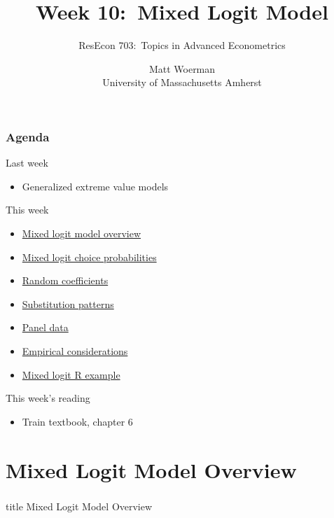 \documentclass{beamer}\usepackage[]{graphicx}\usepackage[]{color}
\title[Week 10:\ Mixed Logit Model]{Week 10:\ Mixed Logit Model}
\author[ResEcon 703:\ Advanced Econometrics]{ResEcon 703:\ Topics in Advanced Econometrics}
\date{Matt Woerman\\University of Massachusetts Amherst}
\begin{document}
{ 
\begin{frame}[noframenumbering]
    \titlepage
\end{frame}
}

\begin{frame}\frametitle{Agenda}
    Last week
    \begin{itemize}
        \item Generalized extreme value models
    \end{itemize}
    \vspace{2ex}
    This week
    \begin{itemize}
    	\item \hyperlink{page.\getpagerefnumber{overview}}{Mixed logit model overview}
    	\item \hyperlink{page.\getpagerefnumber{prob}}{Mixed logit choice probabilities}
        \item \hyperlink{page.\getpagerefnumber{random}}{Random coefficients}
        \item \hyperlink{page.\getpagerefnumber{subs}}{Substitution patterns}
        \item \hyperlink{page.\getpagerefnumber{panel}}{Panel data}
        \item \hyperlink{page.\getpagerefnumber{empirical}}{Empirical considerations}
        \item \hyperlink{page.\getpagerefnumber{example}}{Mixed logit R example}
    \end{itemize}
    \vspace{2ex}
    This week's reading
    \begin{itemize}
    	\item Train textbook, chapter 6
    \end{itemize}
\end{frame}

\section{Mixed Logit Model Overview}
\label{overview}
\begin{frame}\frametitle{}
    \vfill
    \centering
    \begin{beamercolorbox}[center]{title}
        \Large Mixed Logit Model Overview
    \end{beamercolorbox}
    \vfill
\end{frame}
\end{document}
